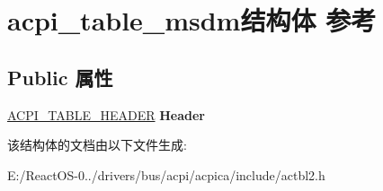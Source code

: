 \hypertarget{structacpi__table__msdm}{}\section{acpi\+\_\+table\+\_\+msdm结构体 参考}
\label{structacpi__table__msdm}
\subsection*{Public 属性}
\begin{DoxyCompactItemize}
\item 
\mbox{\label{structacpi__table__msdm_a2d543f434b6f118afd78a446a11029db}} 
\hyperlink{structacpi__table__header}{A\+C\+P\+I\+\_\+\+T\+A\+B\+L\+E\+\_\+\+H\+E\+A\+D\+ER} {\bfseries Header}
\end{DoxyCompactItemize}


该结构体的文档由以下文件生成\+:\begin{DoxyCompactItemize}
\item 
E\+:/\+React\+O\+S-\/0../drivers/bus/acpi/acpica/include/actbl2.\+h\end{DoxyCompactItemize}
